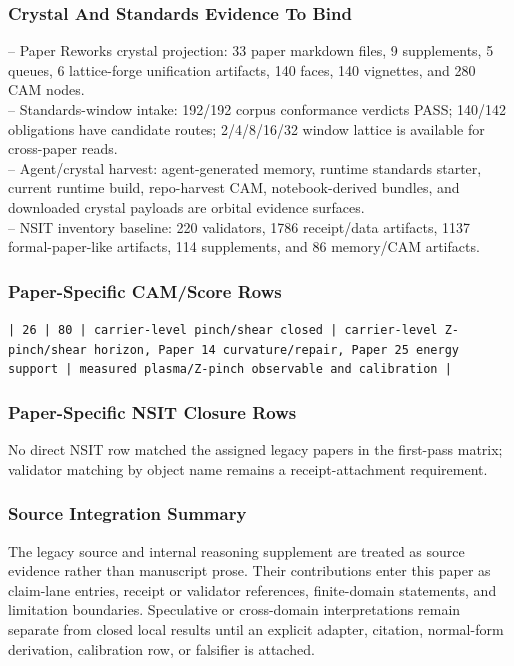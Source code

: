 \documentclass[11pt]{article}
\begin{document}
\subsubsection*{Crystal And Standards Evidence To Bind}

\noindent{}-- Paper Reworks crystal projection: 33 paper markdown files, 9 supplements, 5 queues, 6 lattice-forge unification artifacts, 140 faces, 140 vignettes, and 280 CAM nodes.\\
\noindent{}-- Standards-window intake: 192/192 corpus conformance verdicts PASS; 140/142 obligations have candidate routes; 2/4/8/16/32 window lattice is available for cross-paper reads.\\
\noindent{}-- Agent/crystal harvest: agent-generated memory, runtime standards starter, current runtime build, repo-harvest CAM, notebook-derived bundles, and downloaded crystal payloads are orbital evidence surfaces.\\
\noindent{}-- NSIT inventory baseline: 220 validators, 1786 receipt/data artifacts, 1137 formal-paper-like artifacts, 114 supplements, and 86 memory/CAM artifacts.\\

\subsubsection*{Paper-Specific CAM/Score Rows}

\noindent\texttt{| 26 | 80 | carrier-level pinch/shear closed | carrier-level Z-pinch/shear horizon, Paper 14 curvature/repair, Paper 25 energy support | measured plasma/Z-pinch observable and calibration |}\\

\subsubsection*{Paper-Specific NSIT Closure Rows}

No direct NSIT row matched the assigned legacy papers in the first-pass matrix; validator matching by object name remains a receipt-attachment requirement.

\subsubsection*{Source Integration Summary}

The legacy source and internal reasoning supplement are treated as source
evidence rather than manuscript prose. Their contributions enter this paper as
claim-lane entries, receipt or validator references, finite-domain statements,
and limitation boundaries. Speculative or cross-domain interpretations remain
separate from closed local results until an explicit adapter, citation,
normal-form derivation, calibration row, or falsifier is attached.
\end{document}
